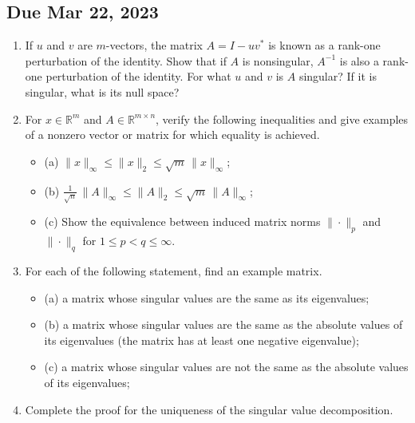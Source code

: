 \subsection*{Due Mar 22, 2023}
\begin{enumerate}[label=\textbf{Problem \arabic*.}]
    \item [10 pt] If \(u\) and \(v\) are \(m\)-vectors, the matrix \(A=I-uv^{*}\) is known as a rank-one perturbation of the identity. Show that if \(A\) is nonsingular, \(A^{-1}\) is also a rank-one perturbation of the identity. For what \(u\) and \(v\) is \(A\) singular? If it is singular, what is its null space?
    \item [10 pt] For \(x\in\mathbb{R}^{m}\) and \(A\in\mathbb{R}^{m\times n}\), verify the following inequalities and give examples of a nonzero vector or matrix for which equality is achieved.
    \begin{itemize}
        \item (a) \(\|x\|_{\infty}\leq\|x\|_{2}\leq\sqrt{m}\,\|x\|_{\infty}\);
        \item (b) \(\frac{1}{\sqrt{n}}\,\|A\|_{\infty}\leq\|A\|_{2}\leq\sqrt{m}\,\|A\|_{\infty}\);
        \item (c) Show the equivalence between induced matrix norms \(\|\cdot\|_{p}\) and \(\|\cdot\|_{q}\) for \(1\leq p<q\leq\infty\).
    \end{itemize}
    \item [10 pt] For each of the following statement, find an example matrix.
    \begin{itemize}
        \item (a) a matrix whose singular values are the same as its eigenvalues;
        \item (b) a matrix whose singular values are the same as the absolute values of its eigenvalues (the matrix has at least one negative eigenvalue);
        \item (c) a matrix whose singular values are not the same as the absolute values of its eigenvalues;
    \end{itemize}
    \item [10 pt] Complete the proof for the uniqueness of the singular value decomposition.
    

\end{enumerate}
